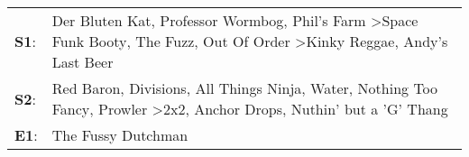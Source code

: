 \begin{supertabular}{p{0.03\textwidth}p{0.92\textwidth}}
 \textbf{S1}:  &              Der Bluten Kat\textsuperscript{}, \enspace Professor Wormbog\textsuperscript{}, \enspace Phil's Farm\textsuperscript{} \textgreater \enspace Space Funk Booty\textsuperscript{}, \enspace The Fuzz\textsuperscript{}, \enspace Out Of Order\textsuperscript{} \textgreater \enspace Kinky Reggae\textsuperscript{}, \enspace Andy's Last Beer\textsuperscript{}  \enspace  \\
 \textbf{S2}:  &  Red Baron\textsuperscript{}, \enspace Divisions\textsuperscript{}, \enspace All Things Ninja\textsuperscript{}, \enspace Water\textsuperscript{}, \enspace Nothing Too Fancy\textsuperscript{}, \enspace Prowler\textsuperscript{} \textgreater \enspace 2x2\textsuperscript{}, \enspace Anchor Drops\textsuperscript{}, \enspace Nuthin' but a 'G' Thang\textsuperscript{}  \enspace  \\
 \textbf{E1}:  &                                                                                                                                                                                                                                                                                                                                         The Fussy Dutchman\textsuperscript{}  \enspace  \\
\end{supertabular}
